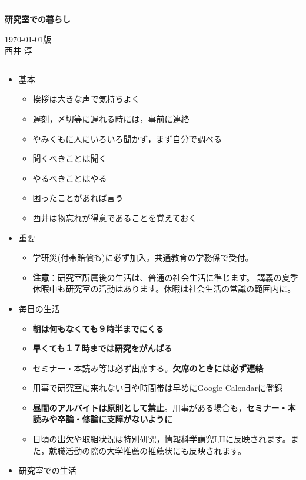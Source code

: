 \documentclass[11pt, ]{jsarticle}
\providecommand{\tightlist}{%
   \setlength{\itemsep}{0pt}\setlength{\parskip}{0pt}}
\begin{document}
\noindent
\rule{\linewidth}{0.3pt}
\begin{center}
  \textbf{\LARGE 研究室での暮らし}
\end{center}
\begin{flushright}
\today 版\\
西井 淳
\end{flushright}
\rule{\linewidth}{0.3pt}
  

\begin{itemize}
\tightlist
\item
  基本

  \begin{itemize}
  \tightlist
  \item
    挨拶は大きな声で気持ちよく
  \item
    遅刻，〆切等に遅れる時には，事前に連絡
  \item
    やみくもに人にいろいろ聞かず，まず自分で調べる
  \item
    聞くべきことは聞く
  \item
    やるべきことはやる
  \item
    困ったことがあれば言う
  \item
    西井は物忘れが得意であることを覚えておく
  \end{itemize}
\item
  重要

  \begin{itemize}
  \tightlist
  \item
    学研災(付帯賠償も)に必ず加入。共通教育の学務係で受付。
  \item
    \textbf{注意}：研究室所属後の生活は、普通の社会生活に準じます。
    講義の夏季休暇中も研究室の活動はあります。休暇は社会生活の常識の範囲内に。
  \end{itemize}
\item
  毎日の生活

  \begin{itemize}
  \tightlist
  \item
    \textbf{朝は何もなくても９時半までにくる}
  \item
    \textbf{早くても１７時までは研究をがんばる}
  \item
    セミナー・本読み等は必ず出席する。\textbf{欠席のときには必ず連絡}
  \item
    用事で研究室に来れない日や時間帯は早めにGoogle Calendarに登録
  \item
    \textbf{昼間のアルバイトは原則として禁止}。用事がある場合も，\textbf{セミナー・本読みや卒論・修論に支障がないように}
  \item
    日頃の出欠や取組状況は特別研究，情報科学講究I,IIに反映されます。また，就職活動の際の大学推薦の推薦状にも反映されます。
  \end{itemize}
\item
  研究室での生活


\end{itemize}
\end{document}
